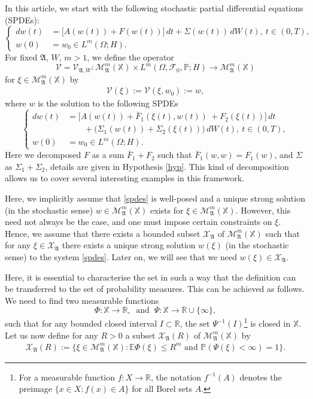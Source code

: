 \documentclass[english,a4paper,11pt]{amsart}
\theoremstyle{plain}
\theoremstyle{definition}
\theoremstyle{remark}
\numberwithin{equation}{section}
\newcommand{\MA}{\mathfrak{A}}
\newcommand{\lk}{\left}
\newcommand{\rk}{\right}
\newcommand{\PP}{{\mathbb{P}}}
\newcommand{\EE}{ \mathbb{E} }
\newcommand{\DEQSZ}{\begin{eqnarray} }
\newcommand{\EEQSZ}{\end{eqnarray} }
\newcommand{\Fcal} {{\mathcal F}}
\newcommand{\Mcal} {{\mathcal M}}
\newcommand{\Vcal} {{\mathcal V}}
\newcommand{\Afrak} {{\mathfrak A}}
\renewcommand{\P}{\mathbb{P}}
\newcommand{\X}{\mathbb{X}}
\begin{document}
	In this article, we start with the following stochastic partial differential equations (SPDEs):
	\begin{equation} \label{spdes1}
		\left\{
		\begin{aligned}
			dw(t) &=\big[A(w(t))+ F(w(t))\big]\, dt  +\Sigma(w(t))\,dW(t), \ t\in(0,T),\\
			w(0)&=w_0\in L^m(\Omega; H).
		\end{aligned}\right.
	\end{equation}
	For fixed $\Afrak$, $W$, {$m> 1$}, we define the operator 
	$$
	\Vcal=\Vcal_{\Afrak,W}:\Mcal_{\Afrak}^{m}(\X)\times L^m(\Omega,\Fcal_0,\P;H)\to\Mcal_{\Afrak}^{m}(\X)
	$$
	for $\xi\in\Mcal_{\MA}^m(\X)$ by
	\begin{align*}
		\Vcal(\xi):=\Vcal(\xi,w_0):=w,
	\end{align*} 
	where $w$ is the solution to the following SPDEs
	\begin{equation} \label{spdes}
		\left\{
		\begin{aligned}
				dw(t) &=\big[A(w(t))+ { \bar F_1(\xi(t),w(t))}\ +F_2(\xi (t))\big]\, dt  \\&\qquad +\big(\Sigma_1(w(t))+\Sigma_2(\xi(t))\big)\,dW(t), \ t\in(0,T),\\
				 w(0)&=w_0\in L^m(\Omega; H).
		\end{aligned}\right.
	\end{equation}
	Here we decomposed $F$ as a sum $\bar F_1+F_2$ such that $\bar F_1(w,w)=F_1(w)$, and $\Sigma$ as $\Sigma_1+\Sigma_2$, details are given in Hypothesis \ref{hyp}. This kind of decomposition allows us to cover several interesting examples in this framework.
	
	
	Here, we implicitly assume that \eqref{spdes} is well-posed and a unique strong solution (in the stochastic sense) $w\in\Mcal_{\MA}^m(\X)$ exists for $\xi\in\Mcal_{\MA}^m(\X)$.
However, this need not always be the case, and one must impose certain constraints on $\xi$.  	
Hence, 	we assume that there exists a bounded subset $\mathcal{X}_\MA$ of $\Mcal_{\MA}^m(\X)$
	such that for any $\xi\in\mathcal{X}_\MA$
	there exists  a unique strong solution  $w(\xi)$ (in the stochastic sense) to the system \eqref{spdes}. Later on, we will see that we need $w(\xi)\in \mathcal{X}_\MA$.
		
Here, it is essential to characterise the set in such a way that the definition can be 
transferred to the set of probability measures. This can be achieved as follows.  
We need to find two measurable functions 
\[
\Phi:\mathbb{X}\to\mathbb{R}, \ \text{ and } \ 
\Psi:\mathbb{X}\to \mathbb{R}\cup\{\infty\},
\]  
such that for any bounded closed interval \(I\subset \mathbb{R}\), the set 
\(\Psi^{-1}(I)\)\footnote{For a measurable function \(f:X\to\mathbb{R}\), the notation 
	\(f^{-1}(A)\) denotes the preimage \(\{x\in X : f(x)\in A\}\) for all Borel sets \(A\).} 
is closed in \(\mathbb{X}\).
%
	Let us now define for any   $R>0$
	a subset
	$\mathcal{X}_{\MA}(R)$ of $\mathcal{M}_\MA^m(\mathbb{X})$ by
	\DEQSZ\label{characteriseK}
	\mathcal{X}_{\MA}(R):=\Big\{ \xi\in \mathcal{M}_\MA^m(\mathbb{X}):\EE\Phi(\xi)\le R^m \mbox{ and } \PP\lk(\Psi(\xi)<\infty\rk)=1\Big\}.
	\EEQSZ
\end{document}
